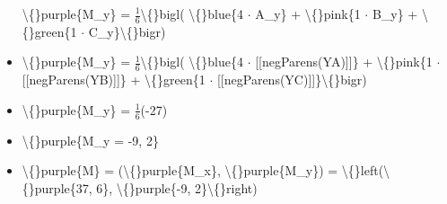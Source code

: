 \documentclass{article}
\begin{document}
\begin{itemize}
                            \textbackslash\{\}purple\{M\_y\} = $\frac{1}{6}$\textbackslash\{\}bigl(
                            \textbackslash\{\}blue\{4 $\cdot$ A\_y\} + 
                            \textbackslash\{\}pink\{1 $\cdot$ B\_y\} + 
                            \textbackslash\{\}green\{1 $\cdot$ C\_y\}\textbackslash\{\}bigr)
  \item \textbackslash\{\}purple\{M\_y\} = $\frac{1}{6}$\textbackslash\{\}bigl(
                        \textbackslash\{\}blue\{4 $\cdot$ [[negParens(YA)]]\} + 
                        \textbackslash\{\}pink\{1 $\cdot$ [[negParens(YB)]]\} + 
                        \textbackslash\{\}green\{1 $\cdot$ [[negParens(YC)]]\}\textbackslash\{\}bigr)
  \item \textbackslash\{\}purple\{M\_y\} = $\frac{1}{6}$(-27)
  \item \textbackslash\{\}purple\{M\_y = -9, 2\}
  \item \textbackslash\{\}purple\{M\} = (\textbackslash\{\}purple\{M\_x\}, \textbackslash\{\}purple\{M\_y\}) = \textbackslash\{\}left(\textbackslash\{\}purple\{37, 6\}, \textbackslash\{\}purple\{-9, 2\}\textbackslash\{\}right)
\end{itemize}
\end{document}
